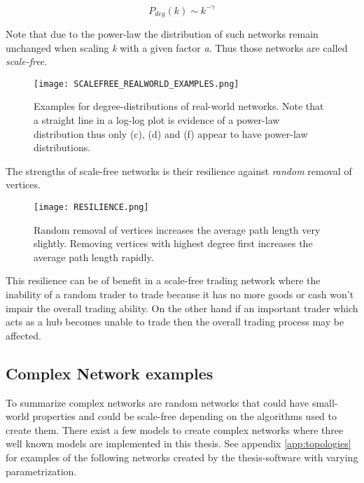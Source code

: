 \documentclass[../Bachelorarbeit.tex]{subfiles}
\begin{document}
\begin{equation}
P_{deg}(k) \sim k^{-\gamma}
\end{equation}

Note that due to the power-law the distribution of such networks remain unchanged when scaling \textit{k} with a given factor \textit{a}. Thus those networks are called \textit{scale-free}.

\begin{figure}[H]
	\centering
  \texttt{[image: SCALEFREE\_REALWORLD\_EXAMPLES.png]}
  	\caption{Examples for degree-distributions of real-world networks. Note that a straight line in a log-log plot is evidence of a power-law distribution thus only (c), (d) and (f) appear to have power-law distributions. \cite{Newman_ComplexNetworks} }
	\label{fig:SCALEFREE_REALWORLD_EXAMPLES}
\end{figure}

\medskip

The strengths of scale-free networks is their resilience against \textit{random} removal of vertices.

\begin{figure}[H]
	\centering
  \texttt{[image: RESILIENCE.png]}
  	\caption{Random removal of vertices increases the average path length very slightly. Removing vertices with highest degree first increases the average path length rapidly. \cite{Newman_ComplexNetworks} }
	\label{fig:RESILIENCE}
\end{figure}

This resilience can be of benefit in a scale-free trading network where the inability of a random trader to trade because it has no more goods or cash won't impair the overall trading ability. On the other hand if an important trader which acts as a hub becomes unable to trade then the overall trading process may be affected.

\subsection{Complex Network examples}
To summarize complex networks are random networks that could have small-world properties and could be scale-free depending on the algorithms used to create them. There exist a few models to create complex networks where three well known models are implemented in this thesis. See appendix \ref{app:topologies} for examples of the following networks created by the thesis-software with varying parametrization.
\end{document}
